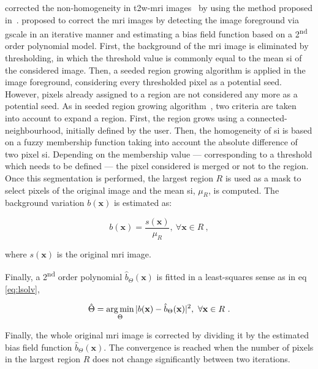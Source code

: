 \citeauthor{Lv2009} corrected the non-homogeneity in \ac{t2w}-\ac{mri} images~\cite{Lv2009} by using the method proposed in~\cite{Madabhushi2006}.
\citeauthor{Madabhushi2006} proposed to correct the \ac{mri} images by detecting the image foreground via \ac{gscale} in an iterative manner and estimating a bias field function based on a 2\textsuperscript{nd} order polynomial model.
First, the background of the \ac{mri} image is eliminated by thresholding, in which the threshold value is commonly equal to the mean \ac{si} of the considered image.
Then, a seeded region growing algorithm is applied in the image foreground, considering every thresholded pixel as a potential seed.
However, pixels already assigned to a region are not considered any more as a potential seed.
As in seeded region growing algorithm~\cite{Shapiro2001}, two criteria are taken into account to expand a region.
First, the region grows using a connected-neighbourhood, initially defined by the user.
Then, the homogeneity of \ac{si} is based on a fuzzy membership function taking into account the absolute difference of two pixel \ac{si}.
Depending on the membership value --- corresponding to a threshold which needs to be defined --- the pixel considered is merged or not to the region.
Once this segmentation is performed, the largest region $R$ is used as a mask to select pixels of the original image and the mean \ac{si}, $\mu_{R}$, is computed. 
The background variation $b(\mathbf{x})$ is estimated as:

\begin{equation}
	b(\mathbf{x}) = \frac{s(\mathbf{x})}{\mu_{R}}, \ \forall \mathbf{x} \in R \ ,
	\label{eq:backest}
\end{equation}

\noindent where $s(\mathbf{x})$ is the original \ac{mri} image.

Finally, a 2\textsuperscript{nd} order polynomial $\hat{b}_{\Theta}(\mathbf{x})$ is fitted in a least-squares sense as in \acs{eq}\,\eqref{eq:lsolv},

\begin{equation}
	\hat{\Theta} = \operatorname*{arg\,min}_{\Theta} | b(\mathbf{x}) - \hat{b}_{\Theta}(\mathbf{x}) |^{2}, \ \forall \mathbf{x} \in R \ .
	\label{eq:lsolv}
\end{equation}

Finally, the whole original \ac{mri} image is corrected by dividing it by the estimated bias field function $\hat{b}_{\Theta}(\mathbf{x})$.
The convergence is reached when the number of pixels in the largest region $R$ does not change significantly between two iterations.

